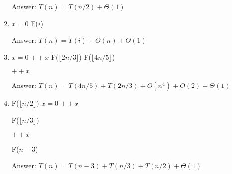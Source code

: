 \documentclass[12pt]{article}
\newenvironment{problem}[2][Problem]{\begin{trivlist}
\item[\hskip \labelsep {\bfseries #1}\hskip \labelsep {\bfseries #2.}]}{\end{trivlist}}
\begin{document}
\begin{problem}{5}
\begin{problem}{6}
\begin{enumerate}
\noindent
Answer: $T(n) = T(n/2) + \Theta(1)$
 
 \item
\begin{algorithm}[H]
\begin{algorithmic}
  \State {}
\Else
  \State $x = 0$
    \State F($i$)
  \EndFor 
\EndIf
\EndProcedure
\end{algorithmic}
\end{algorithm}

\noindent
Answer: $T(n) = T(i) + O(n) + \Theta (1)$
 
\item
\begin{algorithm}[H]
\begin{algorithmic}
  \State {}
\Else
  \State $x = 0$
    \State $++x$
  \EndFor
  \EndFor
  \State F($\lfloor 2n/3 \rfloor$)
  \State F($\lfloor 4n/5 \rfloor$)
  
    \State $++x$
  \EndFor 
\EndIf
\EndProcedure
\end{algorithmic}
\end{algorithm}

\noindent
Answer: $T(n) =T(4n/5) + T(2n/3) + O(n^4) + O(2)+ \Theta(1)$

\item
\begin{algorithm}[H]
\begin{algorithmic}
  \State {}
\Else
  \State F($\lfloor n/2 \rfloor$)
  \State $x = 0$
    \State $++x$
  \EndFor
  \EndFor
  
  \State F($\lfloor n/3 \rfloor$)
  
    \State $++x$
  \EndFor 
  
  \State F($n-3$)
\EndIf
\EndProcedure
\end{algorithmic}
\end{algorithm}

\noindent
Answer: $T(n) = T(n-3) + T(n/3) + T(n/2) + \Theta(1)$
 
\end{enumerate}

\end{problem}

\end{problem}





\end{document}
